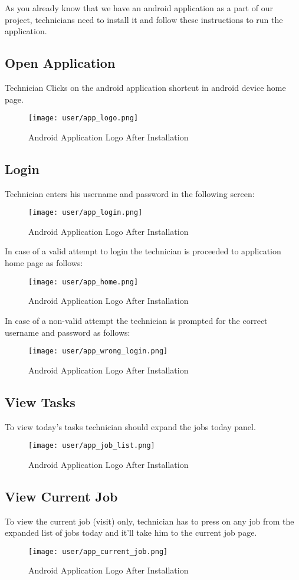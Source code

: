 As you already know that we have an android application as a part of our project, technicians need to install it and follow these instructions to run the application.

\subsection{Open Application}
	Technician Clicks on the android application shortcut in android device home page.
	\begin{figure}[ht]
		\centering
		\texttt{[image: user/app\_logo.png]}
		\caption{Android Application Logo After Installation}
	\end{figure}
	
\subsection{Login}
	Technician enters his username and password in the following screen:
	\begin{figure}[H]
		\centering
		\texttt{[image: user/app\_login.png]}
		\caption{Android Application Logo After Installation}
	\end{figure}
	
	In case of a valid attempt to login the technician is proceeded to application home page as follows:
	\begin{figure}[H]
		\centering
		\texttt{[image: user/app\_home.png]}
		\caption{Android Application Logo After Installation}
	\end{figure}
	
	In case of a non-valid attempt the technician is prompted for the correct username and password as follows:
	\begin{figure}[H]
		\centering
		\texttt{[image: user/app\_wrong\_login.png]}
		\caption{Android Application Logo After Installation}
	\end{figure}
\newpage
\subsection{View Tasks}
	To view today's tasks technician should expand the jobs today panel.
	\begin{figure}[H]
		\centering
		\texttt{[image: user/app\_job\_list.png]}
		\caption{Android Application Logo After Installation}
	\end{figure}
	
\subsection{View Current Job}
	To view the current job (visit) only, technician has to press on any job from the expanded list of jobs today and it'll take him to the current job page.
	\begin{figure}[H]
		\centering
		\texttt{[image: user/app\_current\_job.png]}
		\caption{Android Application Logo After Installation}
	\end{figure}
\newpage
